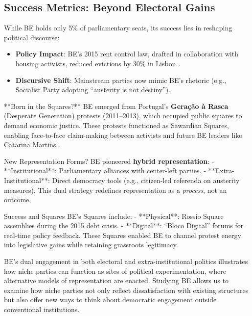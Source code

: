 \begin{greenenv}
	\subsection{Success Metrics: Beyond Electoral Gains}
	While BE holds only 5\% of parliamentary seats, its success lies in reshaping political discourse:
	\begin{itemize}
		\item \textbf{Policy Impact}: BE’s 2015 rent control law, drafted in collaboration with housing activists, reduced evictions by 30\% in Lisbon \parencite[112]{rodrigues2021}.
		\item \textbf{Discursive Shift}: Mainstream parties now mimic BE’s rhetoric (e.g., Socialist Party adopting \enquote{austerity is not destiny}).
	\end{itemize}
	**Born in the Squares?**
	BE emerged from Portugal’s \textbf{Geração à Rasca} (Desperate Generation) protests (2011–2013), which occupied public squares to demand economic justice. These protests functioned as Sawardian Squares, enabling face-to-face claim-making between activists and future BE leaders like Catarina Martins \parencite[88]{baumgarten2017}.

	New Representation Forms?
	BE pioneered \textbf{hybrid representation}:
	- **Institutional**: Parliamentary alliances with center-left parties.
	- **Extra-Institutional**: Direct democracy tools (e.g., citizen-led referenda on austerity measures).
	This dual strategy redefines representation as a \textit{process}, not an outcome.

	Success and Squares
	BE’s Squares include:
	- **Physical**: Rossio Square assemblies during the 2015 debt crisis.
	- **Digital**: \enquote{Bloco Digital} forums for real-time policy feedback.
	These Squares enabled BE to channel protest energy into legislative gains while retaining grassroots legitimacy.

	BE’s dual engagement in both electoral and extra-institutional politics illustrates how niche parties can function as sites of political experimentation, where alternative models of representation are enacted. Studying BE allows us to examine how niche parties not only reflect dissatisfaction with existing structures but also offer new ways to think about democratic engagement outside conventional institutions.
\end{greenenv}

